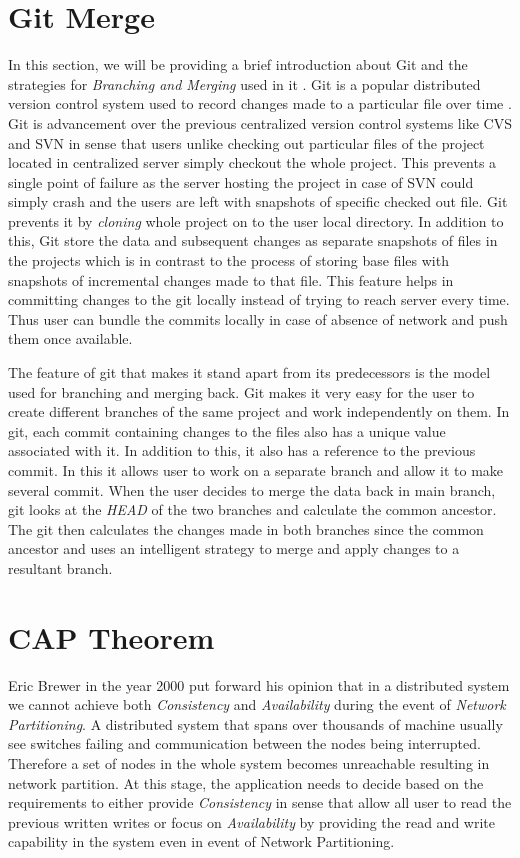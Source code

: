 \documentclass[12pt,a4paper,twoside,openright]{book}
\begin{document}
\section{Git Merge}
In this section, we will be providing a brief introduction about Git and the strategies for \textit{Branching and Merging} used in it \cite{gitmerge}. Git is a popular distributed version control system used to record changes made to a particular file over time \cite{gitVersionControl}. Git is advancement over the previous centralized version control systems like CVS \cite{cvs} and SVN \cite{svn} in sense that users unlike checking out particular files of the project located in centralized server simply checkout the whole project. This prevents a single point of failure as the server hosting the project in case of SVN could simply crash and the users are left with snapshots of specific checked out file. Git prevents it by \textit{cloning} whole project on to the user local directory. In addition to this, Git store the data and subsequent changes as separate snapshots of files in the projects which is in contrast to the process of storing base files with snapshots of incremental changes made to that file. This feature helps in committing changes to the git locally instead of trying to reach server every time. Thus user can bundle the commits locally in case of absence of network and push them once available.
\par The feature of git that makes it stand apart from its predecessors is the model used for branching and merging back. Git makes it very easy for the user to create different branches of the same project and work independently on them. In git, each commit containing changes to the files also has a unique value associated with it. In addition to this, it also has a reference to the previous commit. In this it allows user to work on a separate branch and allow it to make several commit. When the user decides to merge the data back in main branch, git looks at the \textit{HEAD} of the two branches and calculate the common ancestor. The git then calculates the changes made in both branches since the common ancestor and uses an intelligent strategy to merge and apply changes to a resultant branch. 


\section{CAP Theorem}
Eric Brewer in the year 2000 put forward his opinion that in a distributed system we cannot achieve both \textit{Consistency} and \textit{Availability} during the event of \textit{Network Partitioning}. A distributed system that spans over thousands of machine usually see switches failing and communication between the nodes being interrupted. Therefore a set of nodes in the whole system becomes unreachable resulting in network partition. At this stage, the application needs to decide based on the requirements to either provide \textit{Consistency} in sense that allow all user to read the previous written writes or focus on \textit{Availability} by providing the read and write capability in the system even in event of Network Partitioning.
\end{document}
